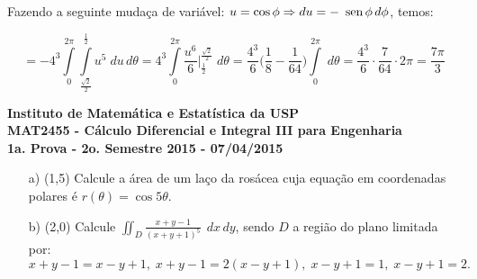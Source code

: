 \documentclass[12pt,a4paper]{article}
\newcommand{\sen}{\mbox{\, sen}\,}
\begin{document}
Fazendo a seguinte mudaça de variável: $u = \cos\phi \Rightarrow du = -\sen\phi \, d\phi $, temos:

$$ = -4^3 \int\limits_{0}^{2\pi} \int\limits_{\frac{\sqrt{2}}{2}}^{\frac{1}{2}}  u^5 \;du\,d\theta = 4^3 \int\limits_{0}^{2\pi}  \frac{u^6}{6} \Big|_{\frac{1}{2}}^{\frac{\sqrt{2}}{2}} \;d\theta = \frac{4^3}{6} \Big( \frac{1}{8} - \frac{1}{64} \Big) \int\limits_{0}^{2\pi} \; d\theta= \frac{4^3}{6} \cdot \frac{7}{64} \cdot 2 \pi = \frac{7\pi}{3} $$


\newpage
\begin{center}
\textbf{Instituto de Matemática e Estatística da USP\\
MAT2455 - Cálculo Diferencial e Integral III para Engenharia\\}
\textbf{1a. Prova - 2o. Semestre 2015 - 07/04/2015}
\end{center}



\begin{itemize}
	\item[a)] (1,5) Calcule a área de um laço da rosácea cuja equação em coordenadas polares é $r(\theta) = \cos 5\theta$. \\
	\item[b)] (2,0) Calcule  $\displaystyle\iint_D \frac{x+y-1}{(x+y+1)^5}\; \, dx \, dy$, sendo $D$ a região do plano limitada por:
	$$ x+y-1 = x-y+1, \; x+y-1= 2(x-y+1), \; x-y+1=1, \; x-y+1 = 2.$$
	
\end{itemize}
\end{document}
